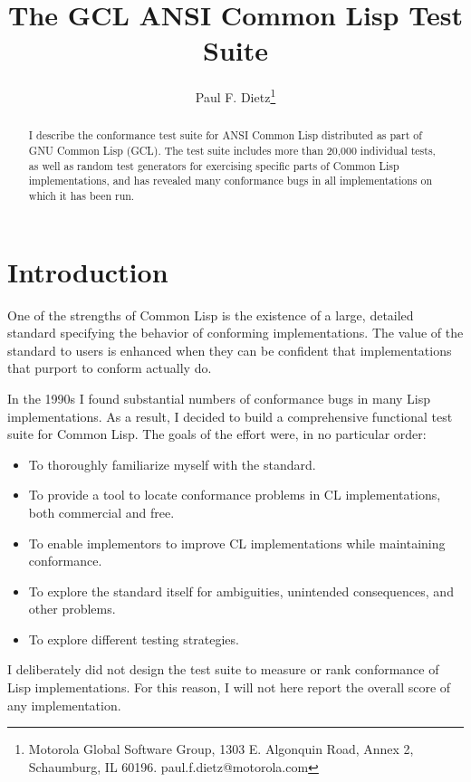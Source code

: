 \documentclass[11pt]{article}
\begin{document}
\title{The GCL ANSI Common Lisp Test Suite}
\author{Paul F. Dietz\footnote{Motorola Global Software Group, 1303
E. Algonquin Road, Annex 2, Schaumburg, IL 60196.  paul.f.dietz@motorola.com}}
\date{}
\maketitle
\thispagestyle{empty}

\begin{abstract}
I describe the conformance test suite for ANSI Common Lisp distributed
as part of GNU Common Lisp (GCL).  The test suite includes more than
20,000 individual tests, as well as random test generators for
exercising specific parts of Common Lisp implementations, and has
revealed many conformance bugs in all implementations on
which it has been run.
\end{abstract}

\section{Introduction}

One of the strengths of Common Lisp is the existence of a large,
detailed standard specifying the behavior of conforming
implementations.  The value of the standard to users is enhanced when
they can be confident that implementations that purport to conform
actually do.

In the 1990s I found substantial numbers of conformance bugs in many
Lisp implementations.  As a result, I decided to build a
comprehensive functional test suite for Common Lisp.  The goals of the
effort were, in no particular order:

\begin{itemize}
\item To thoroughly familiarize myself with the standard.
\item To provide a tool to locate conformance problems in CL
implementations, both commercial and free.
\item To enable implementors to improve CL implementations while
      maintaining conformance.
\item To explore the standard itself for ambiguities, unintended
      consequences, and other problems.
\item To explore different testing strategies.
\end{itemize}

I deliberately did not design the test suite to measure or rank
conformance of Lisp implementations.  For this reason, I will not here
report the overall score of any implementation.
\end{document}
